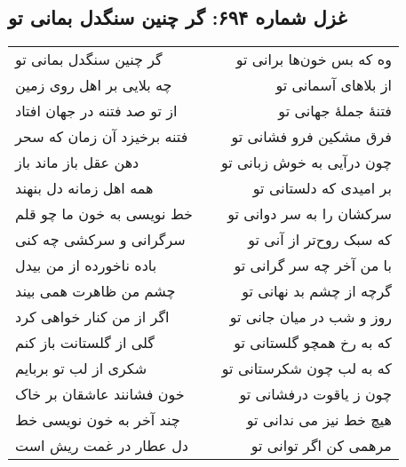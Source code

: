 \begin{center}
\section*{غزل شماره ۶۹۴: گر چنین سنگدل بمانی تو}
\label{sec:694}
\begin{longtable}{l p{0.5cm} r}
گر چنین سنگدل بمانی تو
&&
وه که بس خون‌ها برانی تو
\\
چه بلایی بر اهل روی زمین
&&
از بلاهای آسمانی تو
\\
از تو صد فتنه در جهان افتاد
&&
فتنهٔ جملهٔ جهانی تو
\\
فتنه برخیزد آن زمان که سحر
&&
فرق مشکین فرو فشانی تو
\\
دهن عقل باز ماند باز
&&
چون درآیی به خوش زبانی تو
\\
همه اهل زمانه دل بنهند
&&
بر امیدی که دلستانی تو
\\
خط نویسی به خون ما چو قلم
&&
سرکشان را به سر دوانی تو
\\
سرگرانی و سرکشی چه کنی
&&
که سبک روح‌تر از آنی تو
\\
باده ناخورده از من بیدل
&&
با من آخر چه سر گرانی تو
\\
چشم من ظاهرت همی بیند
&&
گرچه از چشم بد نهانی تو
\\
اگر از من کنار خواهی کرد
&&
روز و شب در میان جانی تو
\\
گلی از گلستانت باز کنم
&&
که به رخ همچو گلستانی تو
\\
شکری از لب تو بربایم
&&
که به لب چون شکرستانی تو
\\
خون فشانند عاشقان بر خاک
&&
چون ز یاقوت درفشانی تو
\\
چند آخر به خون نویسی خط
&&
هیچ خط نیز می ندانی تو
\\
دل عطار در غمت ریش است
&&
مرهمی کن اگر توانی تو
\\
\end{longtable}
\end{center}
